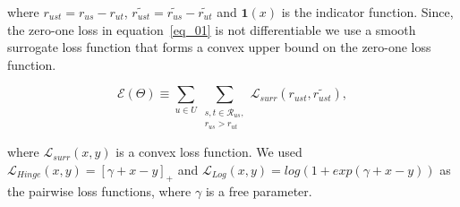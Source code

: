 \noindent where $r_{ust} = r_{us} - r_{ut}$, $\tilde{r_{ust}} = \tilde{r_{us}} -
\tilde{r_{ut}}$ and $\bm{1}(x)$ is the indicator function. Since, the zero-one
loss in equation~\ref{eq_01} is not differentiable we use a smooth surrogate
loss function that forms a convex upper bound on the zero-one loss function.


\begin{equation} \label{eq_smooth}
  \mathcal{E}(\Theta) \equiv \sum_{u \in U} \sum_{\substack{s,t \in
  \mathcal{R}_{us},\\ r_{us} > r_{ut}}} \mathcal{L}_{surr}(r_{ust}, \tilde{r_{ust}}),
\end{equation}

\noindent where $\mathcal{L}_{surr}(x,y)$ is a convex loss function. We used
$\mathcal{L}_{Hinge}(x,y)=[\gamma + x - y]_+$ and $\mathcal{L}_{Log}(x,y) =
log(1+exp(\gamma + x - y))$ as the pairwise loss functions, where $\gamma$ is a
free parameter.
\fi



